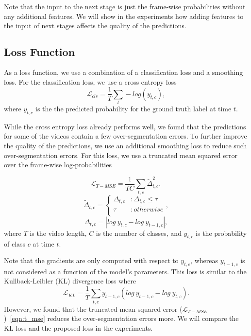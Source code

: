 \documentclass[10pt,twocolumn,letterpaper]{article}
\begin{document}
Note that the input to the next stage is just the frame-wise probabilities without 
any additional features. We will show in the experiments how adding features to the 
input of next stages affects the quality of the predictions.


\subsection{Loss Function}
\label{sec:loss_function}

As a loss function, we use a combination of a classification loss and a smoothing 
loss. For the classification loss, we use a cross entropy loss
\begin{equation}
\mathcal{L}_{cls} = \frac{1}{T}\sum_{t} -log(y_{t,c}), 
\end{equation}
where $y_{t,c}$ is the the predicted probability for the ground truth 
label at time $t$.

While the cross entropy loss already performs well, we found that the predictions 
for some of the videos contain a few over-segmentation errors. To further improve 
the quality of the predictions, we use an additional smoothing loss to reduce such 
over-segmentation errors. For this loss, we use a truncated mean squared error over 
the frame-wise log-probabilities

\begin{equation}\label{eqn:t_mse}
\mathcal{L}_{T-MSE} = \frac{1}{TC}\sum_{t,c}\tilde{\Delta}_{t,c}^2, 
\end{equation}
\begin{equation}
\tilde{\Delta}_{t,c} = 
\begin{cases}
\Delta_{t,c}        &: \Delta_{t,c} \leq \tau\\
\tau                &: otherwise\\
\end{cases}, 
\end{equation}
\begin{equation}
\Delta_{t,c} = \left| log\ y_{t,c} - log\ y_{t-1,c} \right|,
\end{equation}
where $T$ is the video length, $C$ is the number of classes, and $y_{t,c}$ 
is the probability of class $c$ at time $t$. 

Note that the gradients are only computed 
with respect to $y_{t,c}$, whereas $y_{t-1,c}$ is not considered as a function 
of the model's parameters. This loss is similar to the Kullback-Leibler (KL) 
divergence loss where 
\begin{equation}
\mathcal{L}_{KL} = \frac{1}{T}\sum_{t,c} y_{t-1,c} (log\ y_{t-1,c} - log\ y_{t,c}).
\end{equation}
However, we found that the truncated mean squared error ($\mathcal{L}_{T-MSE}$)~\eqref{eqn:t_mse} 
reduces the over-segmentation errors more. We will compare the KL loss and the proposed 
loss in the experiments.
\end{document}
